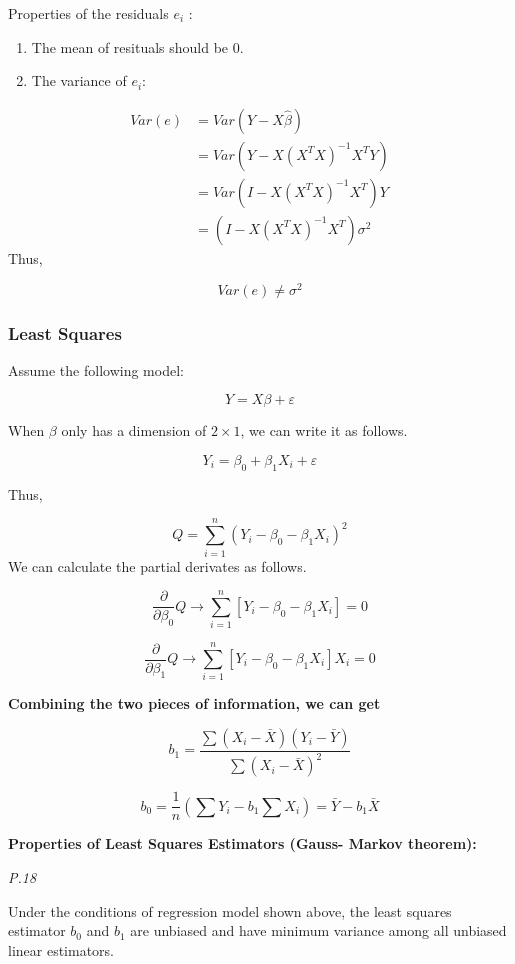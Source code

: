 \documentclass[]{book}
\begin{document}
Properties of the residuals \(e_i\) :

\begin{enumerate}
\def\labelenumi{\arabic{enumi}.}
\item
  The mean of resituals should be \(0\).
\item
  The variance of \(e_i\):
\end{enumerate}

\[\begin{aligned} Var(e) &=Var(Y-X\hat{\beta}) \\ &=Var(Y-X(X^TX)^{-1}X^TY) \\ &=Var(I-X(X^TX)^{-1}X^T)Y \\&=(I-X(X^TX)^{-1}X^{T})\sigma^2 \end{aligned}\]
Thus,

\[Var(e) \neq \sigma^2\]

\hypertarget{least-squares}{%
\subsubsection{Least Squares}\label{least-squares}}

Assume the following model:

\[Y=X\beta +\varepsilon\]

When \(\beta\) only has a dimension of \(2 \times 1\), we can write it as follows.

\[Y_i=\beta_0+\beta_1X_i +\varepsilon\]

Thus,

\[Q=\sum_{i=1}^n (Y_i-\beta_0-\beta_1X_i)^2\]
We can calculate the partial derivates as follows.

\[\frac{\partial}{\partial \beta_0} Q \rightarrow \sum_{i=1}^n [Y_i-\beta_0-\beta_1X_i]=0\]

\[\frac{\partial}{\partial \beta_1} Q \rightarrow \sum_{i=1}^n [Y_i-\beta_0-\beta_1X_i]X_i=0\]

\textbf{Combining the two pieces of information, we can get}

\[b_1=\frac{\sum(X_i-\bar{X})(Y_i-\bar{Y})}{\sum(X_i-\bar{X})^2}\]

\[b_0=\frac{1}{n}(\sum Y_i-b_1\sum X_i)=\bar{Y}-b_1\bar{X}\]

\textbf{Properties of Least Squares Estimators (Gauss- Markov theorem):}

\emph{P.18}

Under the conditions of regression model shown above, the least squares estimator \(b_0\) and \(b_1\) are unbiased and have minimum variance among all unbiased linear estimators.
\end{document}
